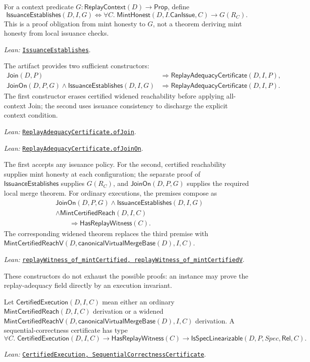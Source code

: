 \documentclass[11pt]{article}
\theoremstyle{definition}
\newcommand{\src}[2]{\href{../../#1}{\texttt{#2}}}
\newcommand{\anchor}[2]{\par\smallskip\noindent\emph{Lean: }\src{#1}{#2}.}
\begin{document}
For a context predicate $G:\mathsf{ReplayContext}(D)\to\mathsf{Prop}$,
define
\[
 \mathsf{IssuanceEstablishes}(D,I,G)\Longleftrightarrow
 \forall C.\;\mathsf{MintHonest}(D,I.\mathsf{CanIssue},C)
 \to G(R_C).
\]
This is a proof obligation from mint honesty to $G$, not a theorem deriving
mint honesty from local issuance checks.
\anchor{Sal/MRDTs/Framework/Certificates.lean}{IssuanceEstablishes}

The artifact provides two sufficient constructors:
\[
\begin{aligned}
 \mathsf{Join}(D,P)
 &\Longrightarrow \mathsf{ReplayAdequacyCertificate}(D,I,P),\\
 \mathsf{JoinOn}(D,P,G)
 \land\mathsf{IssuanceEstablishes}(D,I,G)
 &\Longrightarrow \mathsf{ReplayAdequacyCertificate}(D,I,P).
\end{aligned}
\]
The first constructor erases certified widened reachability before applying
all-context Join; the second uses issuance consistency to discharge the explicit
context condition.
\anchor{Sal/MRDTs/Metatheory/Correctness.lean}
  {ReplayAdequacyCertificate.ofJoin}
\anchor{Sal/MRDTs/Metatheory/Correctness.lean}
  {ReplayAdequacyCertificate.ofJoinOn}

The first accepts any issuance policy. For the second, certified reachability
supplies mint honesty at each configuration; the separate proof of
$\mathsf{IssuanceEstablishes}$ supplies $G(R_C)$, and
$\mathsf{JoinOn}(D,P,G)$ supplies the required local merge theorem.
For ordinary executions, the premises compose as
\[
\begin{aligned}
 &\mathsf{JoinOn}(D,P,G)\land\mathsf{IssuanceEstablishes}(D,I,G)\\
 &\land\mathsf{MintCertifiedReach}(D,I,C)\\
 &\qquad\Longrightarrow\mathsf{HasReplayWitness}(C).
\end{aligned}
\]
The corresponding widened theorem replaces the third premise with
$\mathsf{MintCertifiedReachV}
(D,\mathsf{canonicalVirtualMergeBase}(D),I,C)$.
\anchor{Sal/MRDTs/Metatheory/CertifiedAdequacy.lean}
  {replayWitness\_of\_mintCertified, replayWitness\_of\_mintCertifiedV}

These constructors do not exhaust the possible proofs: an instance may
prove the replay-adequacy field directly by an execution invariant.

Let $\mathsf{CertifiedExecution}(D,I,C)$ mean either an ordinary
$\mathsf{MintCertifiedReach}(D,I,C)$ derivation or a widened
$\mathsf{MintCertifiedReachV}
(D,\mathsf{canonicalVirtualMergeBase}(D),I,C)$ derivation. A
sequential-correctness certificate has type
\[
 \forall C.\;\mathsf{CertifiedExecution}(D,I,C)
 \to\mathsf{HasReplayWitness}(C)
 \to\mathsf{IsSpecLinearizable}(D,P,\mathit{Spec},\mathsf{Rel},C).
\]
\anchor{Sal/MRDTs/Metatheory/Correctness.lean}
  {CertifiedExecution, SequentialCorrectnessCertificate}
\end{document}

